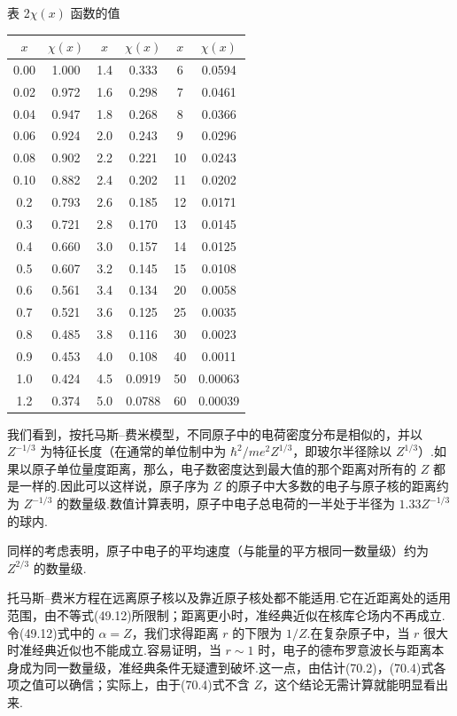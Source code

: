 \begin{center}
{\heiti 表 2}\quad $\chi(x)$ 函数的值\\[0.8em]
\begin{tabular}{|c|c||c|c||c|c|}
\hline
$x$ & $\chi(x)$ & $x$ & $\chi(x)$ & $x$ & $\chi(x)$\\
\hline
0.00 & 1.000 & 1.4 & 0.333 & 6 & 0.0594\\
0.02 & 0.972 & 1.6 & 0.298 & 7 & 0.0461\\
0.04 & 0.947 & 1.8 & 0.268 & 8 & 0.0366\\
0.06 & 0.924 & 2.0 & 0.243 & 9 & 0.0296\\
0.08 & 0.902 & 2.2 & 0.221 & 10 & 0.0243\\
0.10 & 0.882 & 2.4 & 0.202 & 11 & 0.0202\\
0.2 & 0.793 & 2.6 & 0.185 & 12 & 0.0171\\
0.3 & 0.721 & 2.8 & 0.170 & 13 & 0.0145\\
0.4 & 0.660 & 3.0 & 0.157 & 14 & 0.0125\\
0.5 & 0.607 & 3.2 & 0.145 & 15 & 0.0108\\
0.6 & 0.561 & 3.4 & 0.134 & 20 & 0.0058\\
0.7 & 0.521 & 3.6 & 0.125 & 25 & 0.0035\\
0.8 & 0.485 & 3.8 & 0.116 & 30 & 0.0023\\
0.9 & 0.453 & 4.0 & 0.108 & 40 & 0.0011\\
1.0 & 0.424 & 4.5 & 0.0919 & 50 & 0.00063\\
1.2 & 0.374 & 5.0 & 0.0788 & 60 & 0.00039\\
\hline
\end{tabular}
\end{center}

我们看到，按托马斯–费米模型，不同原子中的电荷密度分布是相似的，并以 $Z^{-1/3}$ 为特征长度（在通常的单位制中为 $\hbar^{2}/me^{2}Z^{1/3}$，即玻尔半径除以 $Z^{1/3}$）.如果以原子单位量度距离，那么，电子数密度达到最大值的那个距离对所有的 $Z$ 都是一样的.因此可以这样说，原子序为 $Z$ 的原子中大多数的电子与原子核的距离约为 $Z^{-1/3}$ 的数量级.数值计算表明，原子中电子总电荷的一半处于半径为 $1.33Z^{-1/3}$ 的球内.

同样的考虑表明，原子中电子的平均速度（与能量的平方根同一数量级）约为 $Z^{2/3}$ 的数量级.

托马斯–费米方程在远离原子核以及靠近原子核处都不能适用.它在近距离处的适用范围，由不等式(49.12)所限制；距离更小时，准经典近似在核库仑场内不再成立.令(49.12)式中的 $\alpha=Z$，我们求得距离 $r$ 的下限为 $1/Z$.在复杂原子中，当 $r$ 很大时准经典近似也不能成立.容易证明，当 $r\sim1$ 时，电子的德布罗意波长与距离本身成为同一数量级，准经典条件无疑遭到破坏.这一点，由估计(70.2)，(70.4)式各项之值可以确信；实际上，由于(70.4)式不含 $Z$，这个结论无需计算就能明显看出来.

